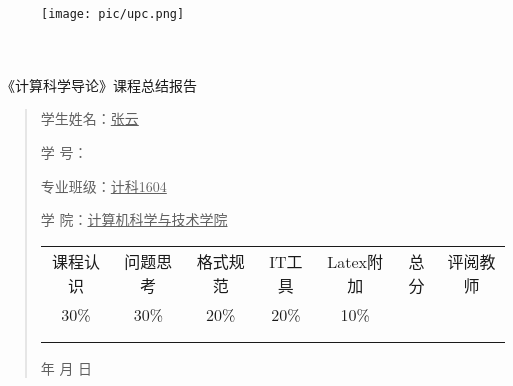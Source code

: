 \documentclass{article}
\renewcommand{\today}{\number\year 年 \number\month 月 \number\day 日}
\begin{document}
\begin{figure}
    \centering
    \texttt{[image: pic/upc.png]}

    \label{figupc}
\end{figure}

	\begin{center}
		\quad \\
		\quad \\
		\heiti \fontsize{45}{17} \quad \quad \quad 
		\vskip 1.5cm
		\heiti {} 《计算科学导论》课程总结报告
	\end{center}
	\vskip 2.0cm
		
	\begin{quotation}
		\doublespacing
		
        \par\setlength\parindent{7em}
		\quad 

		学生姓名：\underline{\qquad  张云 \qquad \qquad}

		学\hspace{0.61cm} 号：\underline{\qquad}
		
		专业班级：\underline{\qquad 计科1604 \qquad  }
		
        学\hspace{0.61cm} 院：\underline{计算机科学与技术学院}
		\vskip 2cm
		\centering
		\begin{table}[h]
            \centering 
            \begin{tabular}{|c|c|c|c|c|c|c|}
                \hline
                课程认识 & 问题思 考 & 格式规范  & IT工具  & Latex附加  & 总分 & 评阅教师 \\
                30\% & 30\% & 20\% & 20\% & 10\% &  &  \\
                \hline
                 & & & & & &\\
                & & & & & &\\
                \hline
            \end{tabular}
        \end{table}
		\vskip 2cm
		\today
	\end{quotation}

\thispagestyle{empty}
\newpage
\setcounter{page}{1}
\end{document}
